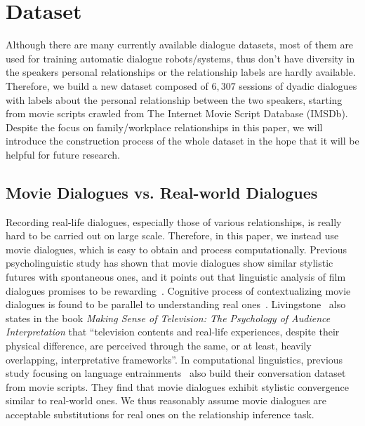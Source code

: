 \section{Dataset}
\label{sec:data}
Although there are many currently available dialogue datasets, 
most of them are used for training automatic dialogue robots/systems, 
thus don't have diversity in the speakers personal relationships or 
the relationship labels are hardly available.
Therefore, we build a new dataset 
composed of $6,307$ sessions of dyadic dialogues with labels 
about the personal relationship between the two speakers, 
starting from movie scripts crawled from 
The Internet Movie Script Database (IMSDb).
Despite the focus on family/workplace relationships in this paper,
we will introduce the construction process of the whole dataset
in the hope that it will be helpful for future research.

\subsection{Movie Dialogues vs. Real-world Dialogues}
Recording real-life dialogues, especially those of various relationships, 
is really hard to be carried out on large scale. Therefore, in this paper,
we instead use movie dialogues, which is 
easy to obtain and process computationally. 
Previous psycholinguistic study has shown that movie dialogues
show similar stylistic futures with spontaneous ones, and it points
out that linguistic analysis of film dialogues promises to be 
rewarding~\cite{overhearer}. Cognitive process of contextualizing
movie dialogues is found to be parallel to understanding real ones~\cite{FSC}.
Livingstone~ also states in 
the book \textit{Making Sense of Television: The Psychology of 
Audience Interpretation} that ``television contents and real-life experiences, 
despite their physical difference, are perceived through the same, 
or at least, heavily overlapping, interpretative frameworks''. In computational
linguistics, previous study focusing on language entrainments~\cite{cornell-corpus} 
also build their conversation dataset from movie scripts. 
They find that movie dialogues exhibit stylistic convergence 
similar to real-world ones.
We thus reasonably assume movie dialogues are acceptable
substitutions for real ones on the relationship inference task.

